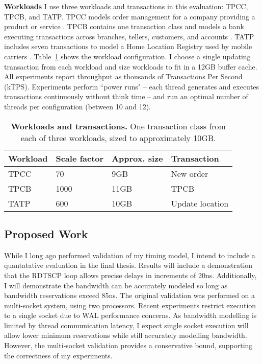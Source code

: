 \textbf{Workloads}
I use three workloads and transactions in this evaluation: TPCC, TPCB, and TATP.
TPCC models order management for a company providing a product or service \cite{TPCC}.
TPCB contains one transaction class and models a bank executing transactions across branches, tellers, customers, and accounts \cite{TPCB}.
TATP includes seven transactions to model a Home Location Registry used by mobile carriers \cite{TATP}.
Table~\ref{table::Workloads} shows the workload configuration.
I choose a single updating transaction from each workload and size workloads to fit in a 12GB buffer cache.
All experiments report throughput as thousands of Transactions Per Second (kTPS).
Experiments perform ``power runs" -- each thread generates and executes transactions continuously without think time -- and run an optimal number of threads per configuration (between 10 and 12).

\begin{table}
  \centering
  \begin{tabular}{l l l l}
    \hline
    Workload & Scale factor & Approx. size & Transaction \\
    \hline \hline
    TPCC & 70 & 9GB & New order \\
    TPCB & 1000 & 11GB & TPCB \\
    TATP & 600 & 10GB & Update location \\
    \hline
  \end{tabular}
  \caption{\textbf{Workloads and transactions.}  One transaction class from each of three workloads, sized to approximately 10GB.}
  \label{table::Workloads}
\end{table}

\subsection{Proposed Work}
\label{sec:OLTP_design:Methodology:Proposed}

While I long ago performed validation of my timing model, I intend to include a quantatative evaluation in the final thesis.
Results will include a demonstration that the RDTSCP loop allows precise delays in increments of 20ns.
Additionally, I will demonstrate the bandwidth can be accurately modeled so long as bandwidth reservations exceed 85ns.
The original validation was performed on a multi-socket system, using two processors.
Recent experiments restrict execution to a single socket due to WAL performance concerns.
As bandwidth modelling is limited by thread communication latency, I expect single socket execution will allow lower minimum reservations while still accurately modelling bandwidth.
However, the multi-socket validation provides a conservative bound, supporting the correctness of my experiments.


